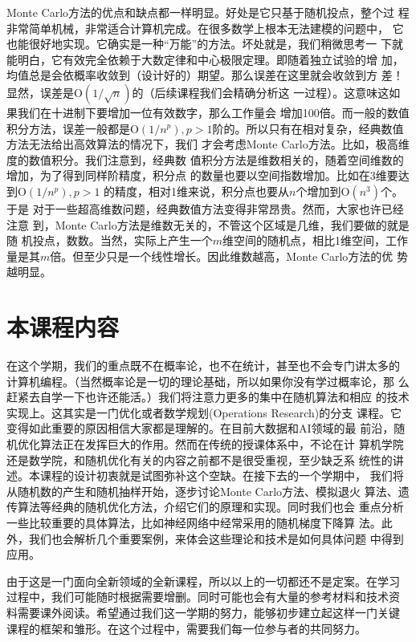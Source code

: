 Monte Carlo方法的优点和缺点都一样明显。好处是它只基于随机投点，整个过
程非常简单机械，非常适合计算机完成。在很多数学上根本无法建模的问题中，
它也能很好地实现。它确实是一种``万能''的方法。坏处就是，我们稍微思考一
下就能明白，它有效完全依赖于大数定律和中心极限定理。即随着独立试验的增
加，均值总是会依概率收敛到（设计好的）期望。那么误差在这里就会收敛到方
差！显然，误差是$\mathrm{O}(1 / \sqrt{n})$的（后续课程我们会精确分析这
  一过程）。这意味这如果我们在十进制下要增加一位有效数字，那么工作量会
增加100倍。而一般的数值积分方法，误差一般都是$\mathrm{O}(1 / n^p), p >
1$阶的。所以只有在相对复杂，经典数值方法无法给出高效算法的情况下，我们
才会考虑Monte Carlo方法。比如，极高维度的数值积分。我们注意到，经典数
值积分方法是维数相关的，随着空间维数的增加，为了得到同样阶精度，积分点
的数量也要以空间指数增加。比如在3维要达到$\mathrm{O}(1 / n^p), p > 1$
的精度，相对1维来说，积分点也要从$n$个增加到$\mathrm{O}(n^3)$个。于是
对于一些超高维数问题，经典数值方法变得非常昂贵。然而，大家也许已经注意
到，Monte Carlo方法是维数无关的，不管这个区域是几维，我们要做的就是随
机投点，数数。当然，实际上产生一个$m$维空间的随机点，相比1维空间，工作
量是其$m$倍。但至少只是一个线性增长。因此维数越高，Monte Carlo方法的优
势越明显。

\section{本课程内容}
在这个学期，我们的重点既不在概率论，也不在统计，甚至也不会专门讲太多的
计算机编程。（当然概率论是一切的理论基础，所以如果你没有学过概率论，那
  么赶紧去自学一下也许还能活。）我们将注意力更多的集中在随机算法和相应
的技术实现上。这其实是一门优化或者数学规划(Operations Research)的分支
课程。它变得如此重要的原因相信大家都是理解的。在目前大数据和AI领域的最
前沿，随机优化算法正在发挥巨大的作用。然而在传统的授课体系中，不论在计
算机学院还是数学院，和随机优化有关的内容之前都不是很受重视，至少缺乏系
统性的讲述。本课程的设计初衷就是试图弥补这个空缺。在接下去的一个学期中，
我们将从随机数的产生和随机抽样开始，逐步讨论Monte Carlo方法、模拟退火
算法、遗传算法等经典的随机优化方法，介绍它们的原理和实现。同时我们也会
重点分析一些比较重要的具体算法，比如神经网络中经常采用的随机梯度下降算
法。此外，我们也会解析几个重要案例，来体会这些理论和技术是如何具体问题
中得到应用。

由于这是一门面向全新领域的全新课程，所以以上的一切都还不是定案。在学习
过程中，我们可能随时根据需要增删。同时可能也会有大量的参考材料和技术资
料需要课外阅读。希望通过我们这一学期的努力，能够初步建立起这样一门关键
课程的框架和雏形。在这个过程中，需要我们每一位参与者的共同努力。
